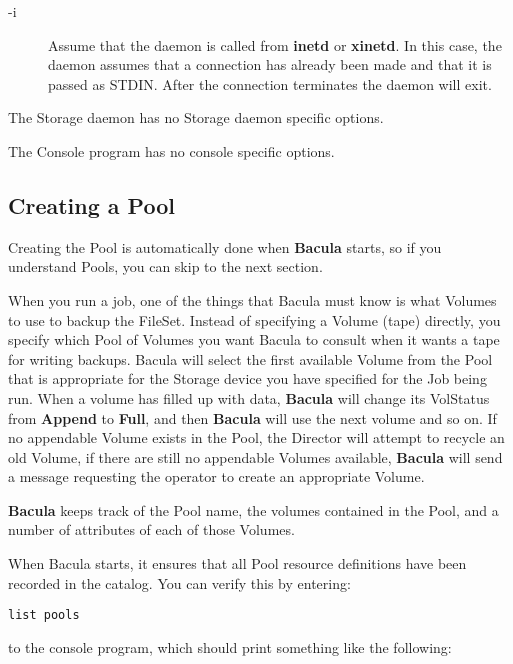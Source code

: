 {{\begin{description}
\item [-i]
   Assume that the daemon is called from {\bf inetd}  or {\bf xinetd}. In this
   case, the daemon assumes that a connection  has already been made and that it
is passed as STDIN. After the  connection terminates the daemon will exit. 
\end{description}

The Storage daemon has no Storage daemon specific options. 

The Console program has no console specific options. 

\subsection*{Creating a Pool}
\label{Pool}

Creating the Pool is automatically done when {\bf Bacula} starts, so if you
understand Pools, you can skip to the next section. 

When you run a job, one of the things that Bacula must know is what Volumes to
use to backup the FileSet. Instead of specifying a Volume (tape) directly, you
specify which Pool of Volumes you want Bacula to consult when it wants a tape
for writing backups. Bacula will select the first available Volume from the
Pool that is appropriate for the Storage device you have specified for the Job
being run. When a volume has filled up with data, {\bf Bacula} will change its
VolStatus from {\bf Append} to {\bf Full}, and then {\bf Bacula} will use the
next volume and so on. If no appendable Volume exists in the Pool, the
Director will attempt to recycle an old Volume, if there are still no
appendable Volumes available, {\bf Bacula} will send a message requesting the
operator to create an appropriate Volume. 

{\bf Bacula} keeps track of the Pool name, the volumes contained in the Pool,
and a number of attributes of each of those Volumes. 

When Bacula starts, it ensures that all Pool resource definitions have been
recorded in the catalog. You can verify this by entering: 

\footnotesize
\begin{verbatim}
list pools
\end{verbatim}
\normalsize

to the console program, which should print something like the following: 

}}
